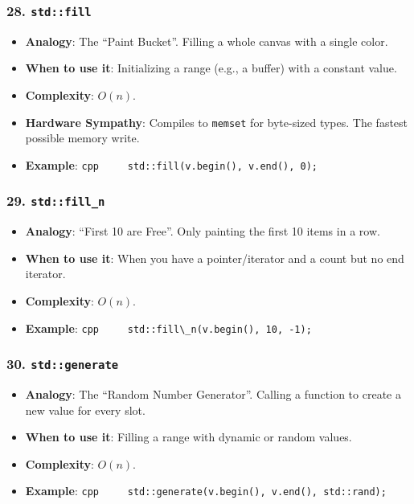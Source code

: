 \hypertarget{stdfill}{%
\subsubsection{\texorpdfstring{28.
\texttt{std::fill}}{28. std::fill}}\label{stdfill}}

\begin{itemize}
\tightlist
\item
  \textbf{Analogy}: The ``Paint Bucket''. Filling a whole canvas with a
  single color.
\item
  \textbf{When to use it}: Initializing a range (e.g., a buffer) with a
  constant value.
\item
  \textbf{Complexity}: \(O(n)\).
\item
  \textbf{Hardware Sympathy}: Compiles to
  \passthrough{\lstinline!memset!} for byte-sized types. The fastest
  possible memory write.
\item
  \textbf{Example}:
  \passthrough{\lstinline!cpp     std::fill(v.begin(), v.end(), 0);!}
\end{itemize}

\hypertarget{stdfill_n}{%
\subsubsection{\texorpdfstring{29.
\texttt{std::fill\_n}}{29. std::fill\_n}}\label{stdfill_n}}

\begin{itemize}
\tightlist
\item
  \textbf{Analogy}: ``First 10 are Free''. Only painting the first 10
  items in a row.
\item
  \textbf{When to use it}: When you have a pointer/iterator and a count
  but no end iterator.
\item
  \textbf{Complexity}: \(O(n)\).
\item
  \textbf{Example}:
  \passthrough{\lstinline!cpp     std::fill\_n(v.begin(), 10, -1);!}
\end{itemize}

\hypertarget{stdgenerate}{%
\subsubsection{\texorpdfstring{30.
\texttt{std::generate}}{30. std::generate}}\label{stdgenerate}}

\begin{itemize}
\tightlist
\item
  \textbf{Analogy}: The ``Random Number Generator''. Calling a function
  to create a new value for every slot.
\item
  \textbf{When to use it}: Filling a range with dynamic or random
  values.
\item
  \textbf{Complexity}: \(O(n)\).
\item
  \textbf{Example}:
  \passthrough{\lstinline!cpp     std::generate(v.begin(), v.end(), std::rand);!}
\end{itemize}

